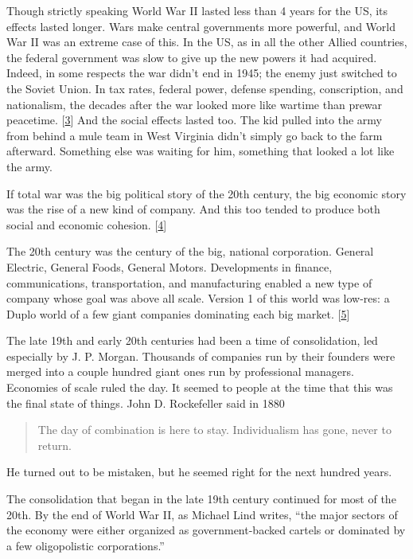 Though strictly speaking World War II lasted less than 4 years for the
US, its effects lasted longer. Wars make central governments more
powerful, and World War II was an extreme case of this. In the US, as in
all the other Allied countries, the federal government was slow to give
up the new powers it had acquired. Indeed, in some respects the war
didn't end in 1945; the enemy just switched to the Soviet Union. In tax
rates, federal power, defense spending, conscription, and nationalism,
the decades after the war looked more like wartime than prewar
peacetime. {[}\hyperref[f3n]{3}{]} And the social effects lasted too.
The kid pulled into the army from behind a mule team in West Virginia
didn't simply go back to the farm afterward. Something else was waiting
for him, something that looked a lot like the army.

If total war was the big political story of the 20th century, the big
economic story was the rise of a new kind of company. And this too
tended to produce both social and economic cohesion.
{[}\hyperref[f4n]{4}{]}

The 20th century was the century of the big, national corporation.
General Electric, General Foods, General Motors. Developments in
finance, communications, transportation, and manufacturing enabled a new
type of company whose goal was above all scale. Version 1 of this world
was low-res: a Duplo world of a few giant companies dominating each big
market. {[}\hyperref[f5n]{5}{]}

The late 19th and early 20th centuries had been a time of consolidation,
led especially by J. P. Morgan. Thousands of companies run by their
founders were merged into a couple hundred giant ones run by
professional managers. Economies of scale ruled the day. It seemed to
people at the time that this was the final state of things. John D.
Rockefeller said in 1880

\begin{quote}
The day of combination is here to stay. Individualism has gone, never to
return.
\end{quote}

He turned out to be mistaken, but he seemed right for the next hundred
years.

The consolidation that began in the late 19th century continued for most
of the 20th. By the end of World War II, as Michael Lind writes, ``the
major sectors of the economy were either organized as government-backed
cartels or dominated by a few oligopolistic corporations.''

